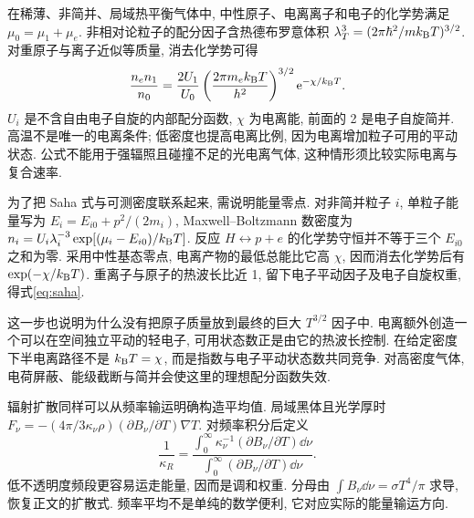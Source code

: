 在稀薄、非简并、局域热平衡气体中, 中性原子、电离离子和电子的化学势满足 $\mu_0=\mu_1+\mu_e$. 非相对论粒子的配分因子含热德布罗意体积 $\lambda_T^3=(2\pi\hbar^2/mk_{\mathrm B} T)^{3/2}$. 对重原子与离子近似等质量, 消去化学势可得
\begin{equation}\label{eq:saha}
\frac{n_en_1}{n_0}=\frac{2U_1}{U_0}
 \left(\frac{2\pi m_ek_{\mathrm B} T}{h^2}\right)^{3/2}\mathrm e^{-\chi/k_{\mathrm B} T}.
\end{equation}
$U_i$ 是不含自由电子自旋的内部配分函数, $\chi$ 为电离能, 前面的 2 是电子自旋简并. 高温不是唯一的电离条件; 低密度也提高电离比例, 因为电离增加粒子可用的平动状态. 公式不能用于强辐照且碰撞不足的光电离气体, 这种情形须比较实际电离与复合速率.

为了把 Saha 式与可测密度联系起来, 需说明能量零点. 对非简并粒子 $i$, 单粒子能量写为 $E_i=E_{i0}+p^2/(2m_i)$, Maxwell--Boltzmann 数密度为 $n_i=U_i\lambda_i^{-3}\exp[(\mu_i-E_{i0})/k_{\mathrm B} T]$. 反应 $H\leftrightarrow p+e$ 的化学势守恒并不等于三个 $E_{i0}$ 之和为零. 采用中性基态零点, 电离产物的最低总能比它高 $\chi$, 因而消去化学势后有 $\exp(-\chi/k_{\mathrm B} T)$. 重离子与原子的热波长比近 1, 留下电子平动因子及电子自旋权重, 得式\eqref{eq:saha}.

这一步也说明为什么没有把原子质量放到最终的巨大 $T^{3/2}$ 因子中. 电离额外创造一个可以在空间独立平动的轻电子, 可用状态数正是由它的热波长控制. 在给定密度下半电离路径不是 $k_{\mathrm B} T=\chi$, 而是指数与电子平动状态数共同竞争. 对高密度气体, 电荷屏蔽、能级截断与简并会使这里的理想配分函数失效.

辐射扩散同样可以从频率输运明确构造平均值. 局域黑体且光学厚时 $F_\nu=-(4\pi/3\kappa_\nu\rho)(\partial B_\nu/\partial T)\nabla T$. 对频率积分后定义
\[
\frac1{\kappa_R}=\frac{\int_0^\infty\kappa_\nu^{-1}(\partial B_\nu/\partial T)\dd\nu}
{\int_0^\infty(\partial B_\nu/\partial T)\dd\nu}.
\]
低不透明度频段更容易运走能量, 因而是调和权重. 分母由 $\int B_\nu\dd\nu=\sigma T^4/\pi$ 求导, 恢复正文的扩散式. 频率平均不是单纯的数学便利, 它对应实际的能量输运方向.
